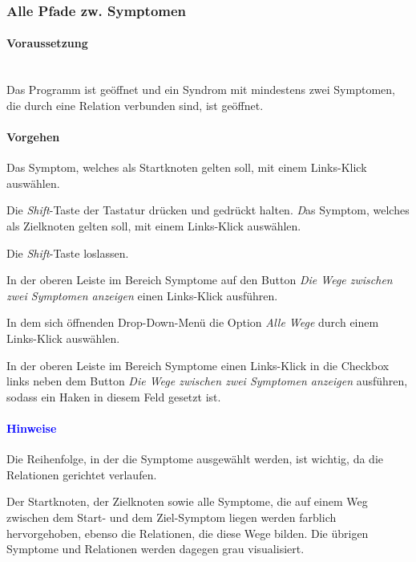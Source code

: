 \documentclass[enabledeprecatedfontcommands,fontsize=11pt,paper=a4,twoside]{scrartcl}
\newcounter{one}
\newcounter{two}[one]
\newcommand*{\hint}{\paragraph{\textcolor{blue}{Hinweise}}}
\newcommand*{\condition}{\paragraph{Voraussetzung}$\;$ \vspace{0.2cm}\\}
\newcommand*{\action}{\paragraph{Vorgehen}}
\let\tempone\itemize
\let\temptwo\enditemize
\renewenvironment{itemize}{\tempone\addtolength{\itemsep}{-10.0pt}}{\temptwo}
\let\origenumerate\enumerate
\let\origendenumerate\endenumerate
\renewenvironment{enumerate}{\origenumerate \addtolength{\itemsep}{-10.0pt}}{\origendenumerate}
\begin{document}
\subsubsection{Alle Pfade zw. Symptomen}
	\condition 
		Das Programm ist geöffnet und ein Syndrom mit mindestens zwei Symptomen, die durch eine Relation verbunden sind, ist geöffnet.
	\action
	\begin{enumerate}
		\item Das Symptom, welches als Startknoten gelten soll, mit einem Links-Klick auswählen.
		\item Die \textit{Shift}-Taste der Tastatur drücken und gedrückt halten.
		\textit Das Symptom, welches als Zielknoten gelten soll, mit einem Links-Klick auswählen.
		\item Die \textit{Shift}-Taste loslassen.
		\item In der oberen Leiste im Bereich Symptome auf den Button \textit{Die Wege zwischen zwei Symptomen anzeigen} einen Links-Klick ausführen.
		\item In dem sich öffnenden Drop-Down-Menü die Option \textit{Alle Wege} durch einem Links-Klick auswählen.
		\item In der oberen Leiste im Bereich Symptome einen Links-Klick in die Checkbox links neben dem Button \textit{Die Wege zwischen zwei Symptomen anzeigen} ausführen, sodass ein Haken in diesem Feld gesetzt ist.
	\end{enumerate} 
	\hint
	\begin{itemize}
		\item Die Reihenfolge, in der die Symptome ausgewählt werden, ist wichtig, da die Relationen gerichtet verlaufen. 
		\item Der Startknoten, der Zielknoten sowie alle Symptome, die auf einem Weg zwischen dem Start- und dem Ziel-Symptom liegen werden farblich hervorgehoben, ebenso die Relationen, die diese Wege bilden. Die übrigen Symptome und Relationen werden dagegen grau visualisiert.\\
	\end{itemize}

\end{document}
